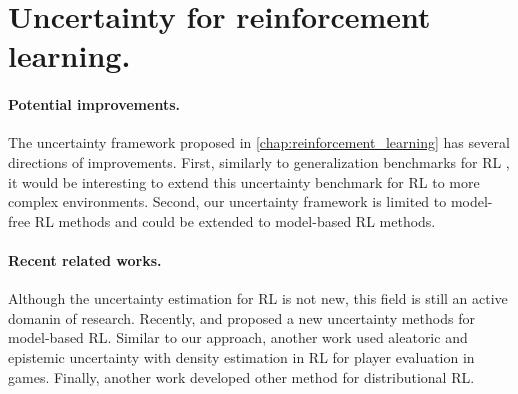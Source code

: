 
\section{Uncertainty for reinforcement learning.}

\paragraph{Potential improvements.} The uncertainty framework proposed in \cref{chap:reinforcement_learning} has several directions of improvements. First, similarly to generalization benchmarks for RL \cite{generalization-rl-survey, assessing-generalization-rl, procgen}, it would be interesting to extend this uncertainty benchmark for RL to more complex environments. Second, our uncertainty framework is limited to model-free RL methods and could be extended to model-based RL methods. 

\paragraph{Recent related works.} Although the uncertainty estimation for RL is not new, this field is still an active domanin of research. Recently, \cite{tennenholtz2022plan} and \cite{wu2022plan} proposed a new uncertainty methods for model-based RL. Similar to our approach, another work \cite{liu2022uncertaintyaware} used aleatoric and epistemic uncertainty with density estimation  in RL for player evaluation in games. Finally, another work \cite{luo2022distributional} developed other method for distributional RL.

